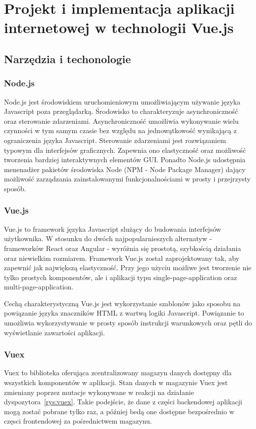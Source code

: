 
\chapter{Projekt i implementacja aplikacji internetowej w technologii Vue.js}
\section{Narzędzia i techonologie}
\subsection{Node.js}
Node.js jest środowiskiem uruchomieniowym umożliwiającym używanie języka Javascript poza przeglądarką. Środowisko to charakteryzuje asynchroniczność oraz sterowanie zdarzeniami. Asynchroniczność umożliwia wykonywanie wielu czynności w tym samym czasie bez względu na jednowątkowość wynikającą z ograniczenia języka Javascript. Sterowanie zdarzeniami jest rozwiązaniem typowym dla interfejsów graficznych. Zapewnia ono elastyczność oraz możliwość tworzenia bardziej interaktywnych elementów GUI. Ponadto Node.js udostępnia menenadżer pakietów środowiska Node (NPM - Node Package Manager) dający możliwość zarządzania zainstalowanymi funkcjonalnościami w prosty i przejrzysty sposób.
\subsection{Vue.js}
Vue.js to framework języka Javascript slużący do budowania interfejsów użytkownika. W stosunku do dwóch najpopularnieszych alternatyw - frameworków React oraz Angular - wyróżnia się prostotą, szybkością działania oraz niewielkim rozmiarem. Framework Vue.js został zaprojektowany tak, aby zapewnić jak największą elastyczność. Przy jego użyciu możliwe jest tworzenie nie tylko prostych komponentów, ale i aplikacji typu single-page-application oraz multi-page-application. 

Cechą charakterystyczną Vue.js jest wykorzystanie szablonów jako sposobu na powiązanie języka znaczników HTML z wartwą logiki Javascript. Powiązanie to umożliwia wykorzystywanie w prosty sposób instrukcji warunkowych oraz pętli do wyświetlanie zawartości aplikacji.   

\subsection{Vuex}
Vuex to biblioteka oferująca zcentralizowany magazyn danych dostępny dla wszystkich komponentów w aplikacji. Stan danych w magazynie Vuex jest zmieniany poprzez mutacje wykonywane w reakcji na działanie dyspozytora~\ref{rys:vuex}. Takie podejście, że dane z części backendowej aplikacji mogą zostać pobrane tylko raz, a później bedą one dostępne bezpośrednio w częsci frontendowej za pośrednictwem magazynu.


